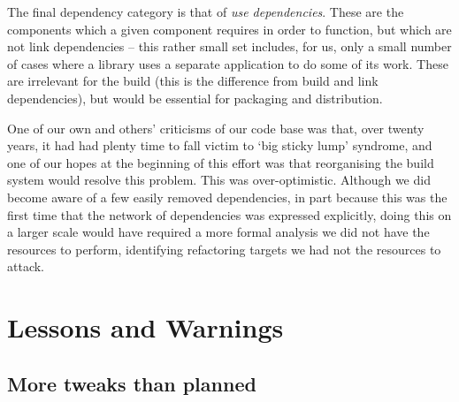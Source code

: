 \documentclass{speauth}
\begin{document}
The final dependency category is that of \emph{use dependencies}.
These are the components which a given component requires in order to
function, but which are not link dependencies -- this rather small set
includes, for us, only a small number of cases where a library uses a
separate application to do some of its work.  These are irrelevant for
the build (this is the difference from build and link dependencies), but would
be essential for packaging and distribution.



One of our own and others' criticisms of our code base was that, over
twenty years, it had had plenty time to fall victim to `big sticky
lump' syndrome, and one of our hopes at the beginning of this effort
was that reorganising the build system would resolve this problem.
This was over-optimistic.  Although we did become aware of a few
easily removed dependencies, in part because this was the first time
that the network of dependencies was expressed explicitly, doing this
on a larger scale would have required a more formal analysis we did
not have the resources to perform, identifying refactoring targets we
had not the resources to attack.


\section{Lessons and Warnings}
\label{s:lessons}

\subsection{More tweaks than planned}
\end{document}
